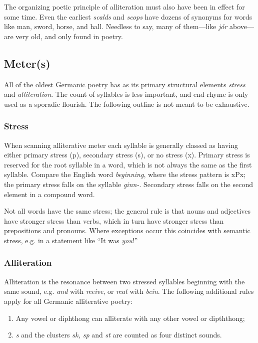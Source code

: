   The organizing poetic principle of alliteration must also have been in effect for some time. Even the earliest \emph{scalds} and \emph{scops} have dozens of synonyms for words like man, sword, horse, and hall. Needless to say, many of them—like \emph{jór} above—are very old, and only found in poetry.

  \subsection{Meter(s)}
    All of the oldest Germanic poetry has as its primary structural elements \emph{stress} and \emph{alliteration}.  The count of syllables is less important, and end-rhyme is only used as a sporadic flourish.  The following outline is not meant to be exhaustive.

    \subsubsection{Stress}
    When scanning alliterative meter each syllable is generally classed as having either primary stress (p), secondary stress (s), or no stress (x).  Primary stress is reserved for the root syllable in a word, which is not always the same as the first syllable.  Compare the English word \emph{beginning}, where the stress pattern is xPx; the primary stress falls on the syllable \emph{ginn-}.  Secondary stress falls on the second element in a compound word.

    Not all words have the same stress; the general rule is that nouns and adjectives have stronger stress than verbs, which in turn have stronger stress than prepositions and pronouns.  Where exceptions occur this coincides with semantic stress, e.g. in a statement like “It was \emph{you}!”

    \subsubsection{Alliteration}
    Alliteration is the resonance between two stressed syllables beginning with the same sound, e.g. \emph{and} with \emph{reeive}, or \emph{reat} with \emph{bein}.  The following additional rules apply for all Germanic alliterative poetry:

    \begin{enumerate}
      \item Any vowel or diphthong can alliterate with any other vowel or dipththong;
      \item \emph{s} and the clusters \emph{sk, sp} and \emph{st} are counted as four distinct sounds.
    \end{enumerate}

